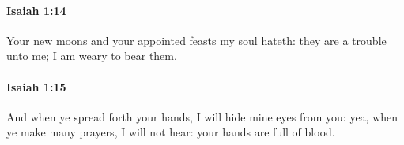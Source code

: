 		\paragraph{Isaiah 1:14} %
			\label{ISAIAH-1-14}

			Your new moons and your appointed feasts my soul hateth: they are a trouble unto me; I am weary to bear them.


		\paragraph{Isaiah 1:15} %
			\label{ISAIAH-1-15}

			And when ye spread forth your hands, I will hide mine eyes from you: yea, when ye make many prayers, I will not hear: your hands are full of blood.


